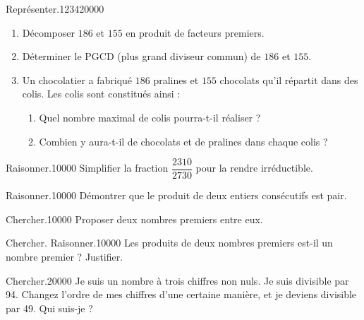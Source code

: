 \begin{pageParcoursu} 



 
\begin{ExoCu}{Représenter.}{1234}{2}{0}{0}{0}{0}

\begin{enumerate}
\item Décomposer $186$ et $155$ en produit de facteurs premiers. 
\item Déterminer le PGCD (plus grand diviseur commun)
  de $186$ et $155$. 
\item Un chocolatier a fabriqué $186$ pralines et $155$ chocolats
  qu'il répartit dans des colis. 
Les colis sont constitués ainsi :
\begin{enumerate}
\item Quel nombre maximal de colis pourra-t-il réaliser ?  
\item Combien y aura-t-il de chocolats et de pralines dans chaque colis ?   
\end{enumerate}
\end{enumerate}
  
\end{ExoCu}


\begin{ExoCuN}{Raisonner.}{1}{0}{0}{0}{0}
Simplifier la fraction $\dfrac{2310}{2730}$ pour la rendre irréductible. 
\end{ExoCuN}


\begin{ExoCuN}{Raisonner.}{1}{0}{0}{0}{0}
Démontrer que le produit de deux entiers consécutifs est pair. 
\end{ExoCuN}

\begin{ExoCuN}{Chercher.}{1}{0}{0}{0}{0}
Proposer deux nombres premiers entre eux. 
\end{ExoCuN}

\begin{ExoCuN}{Chercher. Raisonner.}{1}{0}{0}{0}{0}
Les produits de deux nombres premiers est-il un nombre premier ? Justifier. 
\end{ExoCuN}


\begin{ExoCuN}{Chercher.}{2}{0}{0}{0}{0} 
Je suis un nombre à trois chiffres non nuls. Je suis divisible par 94. Changez l'ordre de mes chiffres d'une certaine manière, et je deviens divisible par 49.
Qui suis-je ?   
\end{ExoCuN}


\end{pageParcoursu} 
 
